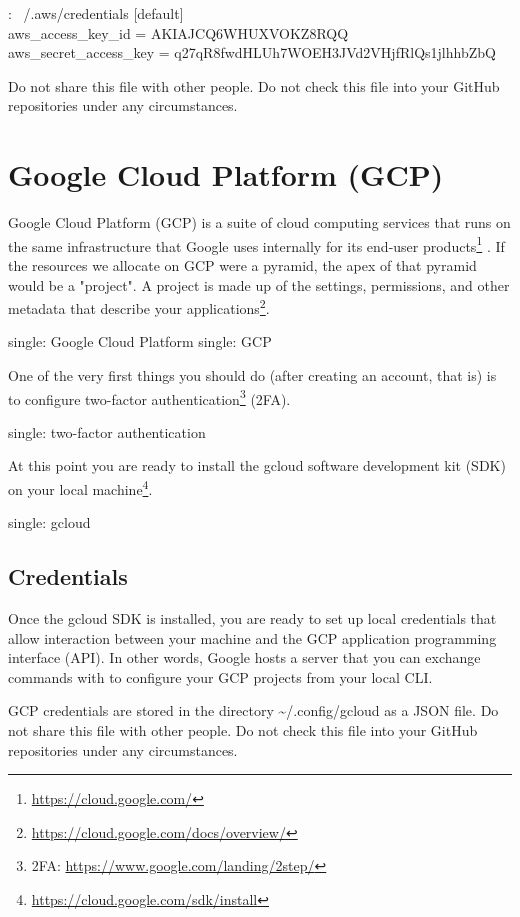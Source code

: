 \begin{mybox}{\thetcbcounter: ~/.aws/credentials}
[default]\\
aws\_access\_key\_id = AKIAJCQ6WHUXVOKZ8RQQ\\
aws\_secret\_access\_key = q27qR8fwdHLUh7WOEH3JVd2VHjfRlQs1jlhhbZbQ\\
\end{mybox}

\justify
Do not share this file with other people. Do not check this file into
your GitHub repositories under any circumstances.

\section{Google Cloud Platform (GCP)}

\justify
Google Cloud Platform (GCP) is a suite of cloud computing services that
runs on the same infrastructure that Google uses internally for its
end-user products\footnote{\url{https://cloud.google.com/}} . If the
resources we allocate on GCP were a pyramid, the apex of that pyramid
would be a "project". A project is made up of the settings, permissions,
and other metadata that describe your applications\footnote{\url{https://cloud.google.com/docs/overview/}}.

single: Google Cloud Platform single: GCP

\justify
One of the very first things you should do (after creating an account,
that is) is to configure two-factor authentication\footnote{2FA:
  \url{https://www.google.com/landing/2step/}} (2FA).

single: two-factor authentication

\justify
At this point you are ready to install the gcloud software development
kit (SDK) on your local machine\footnote{\url{https://cloud.google.com/sdk/install}}.

single: gcloud

\subsection{Credentials}

\justify
Once the gcloud SDK is installed, you are ready to set up local
credentials that allow interaction between your machine and the GCP
application programming interface (API). In other words, Google hosts a
server that you can exchange commands with to configure your GCP
projects from your local CLI.

\justify
GCP credentials are stored in the directory
\textasciitilde{}/.config/gcloud as a JSON file. Do not share this file
with other people. Do not check this file into your GitHub repositories
under any circumstances.

